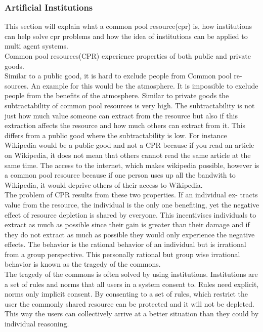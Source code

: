 \documentclass[a4paper]{article}
\begin{document}
\subsubsection{Artificial Institutions}
This section will explain what a common pool resource(cpr) is, how institutions can help solve cpr problems and how the idea of institutions can be applied to multi agent systems. \\
Common pool resources(CPR) experience properties of both public and private
goods. \\
Similar to a public good, it is hard to exclude people from Common pool re-
sources. An example for this would be the atmosphere. It is impossible to
exclude people from the benefits of the atmosphere.
Similar to private goods the subtractability of common pool resources is very
high. The subtractability is not just how much value someone can extract from
the resource but also if this extraction affects the resource and how much others
can extract from it. This differs from a public good where the subtractability
is low. For instance Wikipedia would be a public good and not a CPR because
if you read an article on Wikipedia, it does not mean that others cannot read
the same article at the same time. The access to the internet, which makes
wikipedia possible, however is a common pool resource because if one person
uses up all the bandwith to Wikipedia, it would deprive others of their access to
Wikipedia.\cite{cprbook}\\
The problem of CPR results from these two properties. If an individual ex-
tracts value from the resource, the individual is the only one benefiting, yet the
negative effect of resource depletion is shared by everyone. This incentivises
individuals to extract as much as possible since their gain is greater than their
damage and if they do not extract as much as possible they would only experience the negative effects. The behavior is the rational behavior of an individual
but is irrational from a group perspective. This personally rational but group
wise irrational behavior is known as the tragedy of the commons.\\
The tragedy of the commons is often solved by using institutions. Institutions are  a set of rules and norms that all users in a 
system consent to. Rules need explicit, norms only implicit consent. By consenting to a set of rules, which restrict the user the 
commonly shared resource can be protected and it will not be depleted. This way the users can collectively arrive at a better situation 
than they could by individual reasoning\cite{institutions}. \\
\end{document}
